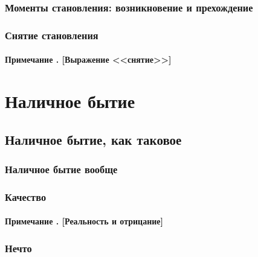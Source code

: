 \documentclass[12pt]{memoir}
\begin{document}
\subsection{Моменты становления: возникновение и прехождение}



\subsection{Снятие становления}



\subsubsection{Примечание . [Выражение <<снятие>>]}



\chapter{Наличное бытие}



\section{Наличное бытие, как таковое}



\subsection{Наличное бытие вообще}



\subsection{Качество}



\subsubsection{Примечание . [Реальность и отрицание]}



\subsection{Нечто}
\end{document}

